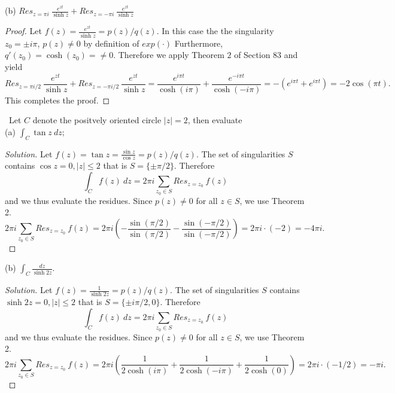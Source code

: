 \documentclass[11pt]{amsart}
\theoremstyle{definition}
\numberwithin{theorem}{section}
\numberwithin{definition}{section}
\numberwithin{equation}{section}
\newenvironment{solution}
  {\begin{proof}[Solution]}
  {\end{proof}}
\newcommand{\parens}[1]{ \left( #1 \right) }
\begin{document}
(b) $Res_{z = \pi i}\ \frac{e^{zt}}{\sinh z} + Res_{z = -\pi i}\ \frac{e^{zt}}{\sinh z} $
\begin{proof}
Let $f(z) = \frac{e^{zt}}{\sinh z} = p(z)/q(z).$ In this case the the singularity $z_0 = \pm i\pi$, 
	$p(z) \neq 0$ by definition of $exp(\cdot)$ Furthermore, $q'(z_0) = \cosh(z_0) = \neq 0$. Therefore we apply Theorem $2$ of Section $83$ and yield
	\begin{equation*}
		Res_{z = \pi i/2}\ \frac{e^{zt}}{\sinh z}  + Res_{z = -\pi i/2}\ \frac{e^{zt}}{\sinh z}  = \frac{e^{ i \pi t}}{\cosh( i \pi)} + \frac{e^{ -i \pi t}}{\cosh( -i \pi)} = -\parens{e^{i\pi t} + e^{i \pi t}} = - 2 \cos(\pi t).
	\end{equation*}
	This completes the proof.
\end{proof}
\medskip {}\ Let $C$ denote the positvely oriented circle $|z| = 2$, then evaluate\\
(a) $\int_C \tan z\ dz;$
\begin{solution}
	Let $f(z) = \tan z = \frac{\sin z}{\cos z} = p(z)/q(z).$ The set of singularities $S$  contains $\cos z = 0, |z| \leq 2$ that is $S = \{\pm \pi/2\}$. Therefore
	\begin{equation*}
		\int_C f(z)\ dz = 2\pi i\sum_{z_0 \in S} Res_{z= z_0}\ f(z)
	\end{equation*}
	and we thus evaluate the residues. Since $p(z) \neq 0$ for all $z \in S$, we use Theorem 2.
	\begin{equation*}
		2\pi i\sum_{z_0 \in S} Res_{z= z_0}\ f(z) = 2\pi i\parens{-\frac{\sin(\pi/2)}{\sin(\pi/2)} -\frac{\sin(-\pi/2)}{\sin(-\pi/2)}} = 2\pi i\cdot (-2) = - 4\pi i.
	\end{equation*}
\end{solution}
(b) $\int_C \frac{dz}{\sinh 2z}.$
\begin{solution}
	Let $f(z) = \frac{1}{\sinh 2z} = p(z)/q(z).$ The set of singularities $S$  contains $\sinh 2 z = 0, |z| \leq 2$ that is $S = \{\pm i\pi/2, 0\}$. Therefore
	\begin{equation*}
		\int_C f(z)\ dz = 2\pi i\sum_{z_0 \in S} Res_{z= z_0}\ f(z)
	\end{equation*}
	and we thus evaluate the residues. Since $p(z) \neq 0$ for all $z \in S$, we use Theorem 2.
	\begin{equation*}
		2\pi i\sum_{z_0 \in S} Res_{z= z_0}\ f(z) = 2\pi i\parens{\frac{1}{2 \cosh(i\pi)} + 	\frac{1}{2\cosh(-i\pi)} + \frac{1}{2\cosh(0)}} = 2\pi i\cdot (-1/2) = -\pi i.
	\end{equation*}
\end{solution}
\end{document}
